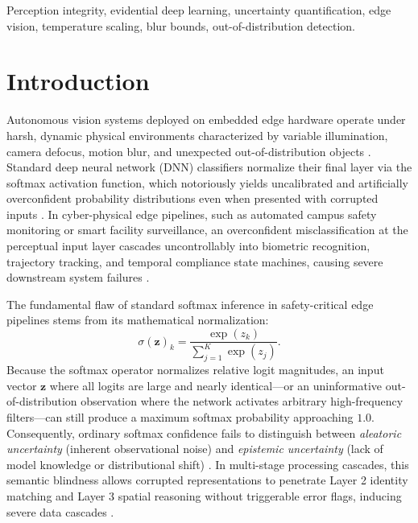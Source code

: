 \documentclass[conference]{IEEEtran}
\begin{document}
\begin{IEEEkeywords}
Perception integrity, evidential deep learning, uncertainty quantification, edge vision, temperature scaling, blur bounds, out-of-distribution detection.
\end{IEEEkeywords}

\section{Introduction}
Autonomous vision systems deployed on embedded edge hardware operate under harsh, dynamic physical environments characterized by variable illumination, camera defocus, motion blur, and unexpected out-of-distribution objects \cite{hendrycks2019benchmarking, dodge2016understanding}. Standard deep neural network (DNN) classifiers normalize their final layer via the softmax activation function, which notoriously yields uncalibrated and artificially overconfident probability distributions even when presented with corrupted inputs \cite{guo2017calibration, nguyen2015deep}. In cyber-physical edge pipelines, such as automated campus safety monitoring or smart facility surveillance, an overconfident misclassification at the perceptual input layer cascades uncontrollably into biometric recognition, trajectory tracking, and temporal compliance state machines, causing severe downstream system failures \cite{sambasivan2021everyone, leveson1995safeware}.

The fundamental flaw of standard softmax inference in safety-critical edge pipelines stems from its mathematical normalization:
\begin{equation}
\sigma(\mathbf{z})_k = \frac{\exp(z_k)}{\sum_{j=1}^K \exp(z_j)}.
\end{equation}
Because the softmax operator normalizes relative logit magnitudes, an input vector $\mathbf{z}$ where all logits are large and nearly identical—or an uninformative out-of-distribution observation where the network activates arbitrary high-frequency filters—can still produce a maximum softmax probability approaching $1.0$. Consequently, ordinary softmax confidence fails to distinguish between \textit{aleatoric uncertainty} (inherent observational noise) and \textit{epistemic uncertainty} (lack of model knowledge or distributional shift) \cite{der2009aleatory, malinin2018predictive}. In multi-stage processing cascades, this semantic blindness allows corrupted representations to penetrate Layer 2 identity matching and Layer 3 spatial reasoning without triggerable error flags, inducing severe data cascades \cite{sambasivan2021everyone}.
\end{document}
